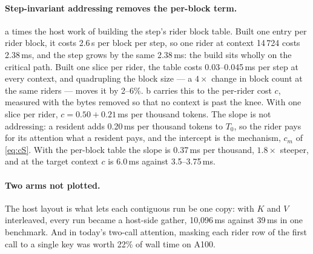 

\paragraph{Step-invariant addressing removes the per-block term.}
a times the host work of building the step's rider block
table. Built one entry per rider block, it costs 2.6\,\textmu s per block per
step, so one rider at context 14\,724 costs 2.38\,ms, and the step grows by the
same 2.38\,ms: the build sits wholly on the critical path. Built one slice per
rider, the table costs 0.03--0.045\,ms per step at every context, and
quadrupling the block size --- a $4\times$ change in block count at the same
riders --- moves it by 2--6\%. b carries this to the
per-rider cost $c$, measured with the bytes removed so that no context is past
the knee. With one slice per rider, $c = 0.50 + 0.21$\,ms per thousand tokens.
The slope is not addressing: a resident adds 0.20\,ms per thousand tokens to
$T_0$, so the rider pays for its attention what a resident pays, and the
intercept is the mechanism, $c_m$ of \cref{eq:cS}. With the per-block table the
slope is 0.37\,ms per thousand, $1.8\times$ steeper, and at the target context
$c$ is 6.0\,ms against 3.5--3.75\,ms.

\paragraph{Two arms not plotted.} The host layout is what lets each contiguous
run be one copy: with $K$ and $V$ interleaved, every run became a host-side
gather, 10{,}096\,ms against 39\,ms in one benchmark. And in today's two-call
attention, masking each rider row of the first call to a single key was worth
22\% of wall time on A100.

